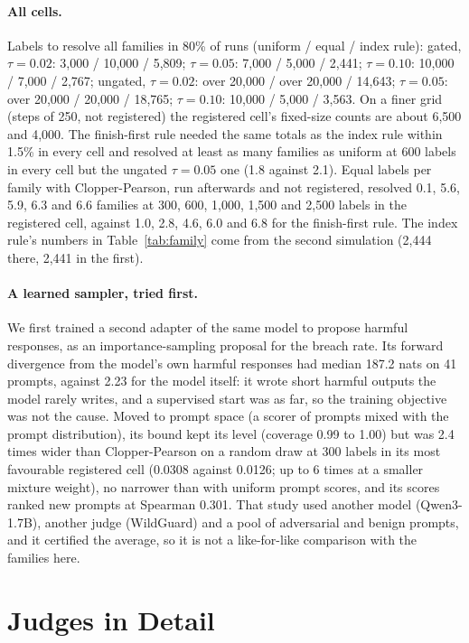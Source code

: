\paragraph{All cells.} Labels to resolve all families in 80\% of runs (uniform / equal / index rule): gated, $\tau=0.02$:
3,000 / 10,000 / 5,809; $\tau=0.05$: 7,000 / 5,000 / 2,441; $\tau=0.10$: 10,000 / 7,000 / 2,767; ungated, $\tau=0.02$:
over 20,000 / over 20,000 / 14,643; $\tau=0.05$: over 20,000 / 20,000 / 18,765; $\tau=0.10$: 10,000 / 5,000 / 3,563. On a finer grid (steps of 250, not registered) the registered cell's fixed-size counts are about 6,500 and 4,000. The
finish-first rule needed the same totals as the index rule within 1.5\% in every cell and resolved at least as many
families as uniform at 600 labels in every cell but the ungated $\tau=0.05$ one (1.8 against 2.1). Equal labels per family with Clopper-Pearson, run
afterwards and not registered, resolved 0.1, 5.6, 5.9, 6.3 and 6.6 families at 300, 600, 1,000, 1,500 and 2,500 labels in
the registered cell, against 1.0, 2.8, 4.6, 6.0 and 6.8 for the finish-first rule. The index rule's
numbers in Table~\ref{tab:family} come from the second simulation (2,444 there, 2,441 in the first).

\paragraph{A learned sampler, tried first.} We first trained a second adapter of the same model to propose harmful
responses, as an importance-sampling proposal for the breach rate. Its forward divergence from the model's own harmful
responses had median 187.2 nats on 41 prompts, against 2.23 for the model itself: it wrote short harmful outputs the
model rarely writes, and a supervised start was as far, so the training objective was not the cause. Moved to prompt space (a scorer of prompts mixed with
the prompt distribution), its bound kept its level (coverage 0.99 to 1.00) but was 2.4 times wider than Clopper-Pearson
on a random draw at 300 labels in its most favourable registered cell (0.0308 against 0.0126; up to 6 times at a
smaller mixture weight), no narrower than with uniform prompt scores, and its scores ranked new prompts at Spearman
0.301. That study used another model (Qwen3-1.7B), another judge (WildGuard) and a pool of adversarial and benign
prompts, and it certified the average, so it is not a like-for-like comparison with the families here.

\section{Judges in Detail}
\label{app:judge}

